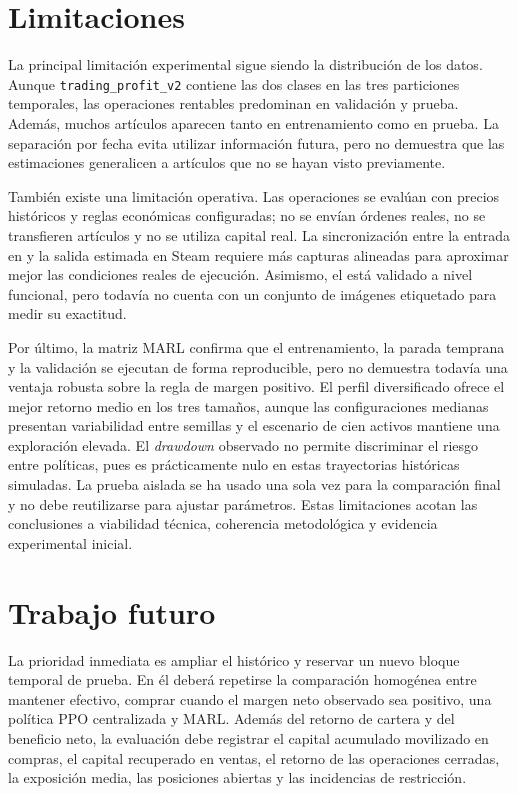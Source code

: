 \section{Limitaciones}

La principal limitación experimental sigue siendo la distribución de los datos. Aunque \texttt{trading\_profit\_v2} contiene las dos clases en las tres particiones temporales, las operaciones rentables predominan en validación y prueba. Además, muchos artículos aparecen tanto en entrenamiento como en prueba. La separación por fecha evita utilizar información futura, pero no demuestra que las estimaciones generalicen a artículos que no se hayan visto previamente.

También existe una limitación operativa. Las operaciones se evalúan con precios históricos y reglas económicas configuradas; no se envían órdenes reales, no se transfieren artículos y no se utiliza capital real. La sincronización entre la entrada en  y la salida estimada en Steam requiere más capturas alineadas para aproximar mejor las condiciones reales de ejecución. Asimismo, el  está validado a nivel funcional, pero todavía no cuenta con un conjunto de imágenes etiquetado para medir su exactitud.

Por último, la matriz MARL confirma que el entrenamiento, la parada temprana y la validación se ejecutan de forma reproducible, pero no demuestra todavía una ventaja robusta sobre la regla de margen positivo. El perfil diversificado ofrece el mejor retorno medio en los tres tamaños, aunque las configuraciones medianas presentan variabilidad entre semillas y el escenario de cien activos mantiene una exploración elevada. El \emph{drawdown} observado no permite discriminar el riesgo entre políticas, pues es prácticamente nulo en estas trayectorias históricas simuladas. La prueba aislada se ha usado una sola vez para la comparación final y no debe reutilizarse para ajustar parámetros. Estas limitaciones acotan las conclusiones a viabilidad técnica, coherencia metodológica y evidencia experimental inicial.

\section{Trabajo futuro}

La prioridad inmediata es ampliar el histórico y reservar un nuevo bloque temporal de prueba. En él deberá repetirse la comparación homogénea entre mantener efectivo, comprar cuando el margen neto observado sea positivo, una política PPO centralizada y MARL. Además del retorno de cartera y del beneficio neto, la evaluación debe registrar el capital acumulado movilizado en compras, el capital recuperado en ventas, el retorno de las operaciones cerradas, la exposición media, las posiciones abiertas y las incidencias de restricción.

